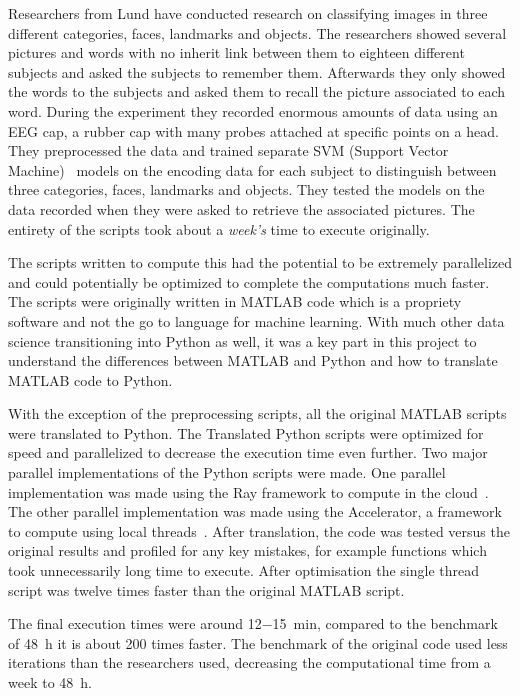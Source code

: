 \documentclass[12pt, a4paper]{article}
\begin{document}
Researchers from Lund have conducted research on classifying images in three different categories, faces, landmarks and objects.
The researchers showed several pictures and words with no inherit link between them to eighteen different subjects and asked the subjects to remember them.
Afterwards they only showed the words to the subjects and asked them to recall the picture associated to each word.
During the experiment they recorded enormous amounts of data using an EEG cap, a rubber cap with many probes attached at specific points on a head.
They preprocessed the data and trained separate SVM (Support Vector Machine)~\cite{wiki:SVM} models on the encoding data for each subject to distinguish between three categories, faces, landmarks and objects.
They tested the models on the data recorded when they were asked to retrieve the associated pictures.
The entirety of the scripts took about a \emph{week's} time to execute originally. 

The scripts written to compute this had the potential to be extremely parallelized and could potentially be optimized to complete the computations much faster.
The scripts were originally written in MATLAB code which is a propriety software and not the go to language for machine learning.
With much other data science transitioning into Python as well, it was a key part in this project to understand the differences between MATLAB and Python and how to translate MATLAB code to Python.\par

With the exception of the preprocessing scripts, all the original MATLAB scripts were translated to Python.
The Translated Python scripts were optimized for speed and parallelized to decrease the execution time even further.
Two major parallel implementations of the Python scripts were made.
One parallel implementation was made using the Ray framework to compute in the cloud~\cite{ray:whatIsRay}.
The other parallel implementation was made using the Accelerator, a framework to compute using local threads~\cite{exax:Accelerator}.
After translation, the code was tested versus the original results and profiled for any key mistakes, for example functions which took unnecessarily long time to execute.
After optimisation the single thread script was twelve times faster than the original MATLAB script.

The final execution times were around \SI[parse-numbers=false]{12-15}{\minute}, compared to the benchmark of \SI{48}{\hour} it is about 200 times faster.
The benchmark of the original code used less iterations than the researchers used, decreasing the computational time from a week to \SI{48}{\hour}.
\end{document}
